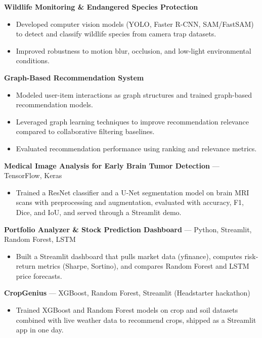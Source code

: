 \documentclass[a4paper,8pt]{extarticle}
\makeatletter
\newcommand{\v}[2]{%
  \edef\@vtmp{,\variant,}%
  \expandafter\in@\expandafter{\@vtmp}{,#1,}%
  \ifin@ #2\fi}
\makeatother
\begin{document}
\v{main,ml,ds,cv,res}{%
\noindent
\textbf{Wildlife Monitoring \& Endangered Species Protection}
\begin{itemize}
\item Developed computer vision models (YOLO, Faster R-CNN, SAM/FastSAM) to detect and classify wildlife species from camera trap datasets.
\item Improved robustness to motion blur, occlusion, and low-light environmental conditions.
\end{itemize}
}

\v{main,ml,ds,res}{%
\noindent
\textbf{Graph-Based Recommendation System}
\begin{itemize}
\item Modeled user-item interactions as graph structures and trained graph-based recommendation models.
\item Leveraged graph learning techniques to improve recommendation relevance compared to collaborative filtering baselines.
\item Evaluated recommendation performance using ranking and relevance metrics.
\end{itemize}
}

\v{cv}{%
\noindent
\textbf{Medical Image Analysis for Early Brain Tumor Detection} --- TensorFlow, Keras
\begin{itemize}
\item Trained a ResNet classifier and a U-Net segmentation model on brain MRI scans with preprocessing and augmentation, evaluated with accuracy, F1, Dice, and IoU, and served through a Streamlit demo.
\end{itemize}
}

\v{ds}{%
\noindent
\textbf{Portfolio Analyzer \& Stock Prediction Dashboard} --- Python, Streamlit, Random Forest, LSTM
\begin{itemize}
\item Built a Streamlit dashboard that pulls market data (yfinance), computes risk-return metrics (Sharpe, Sortino), and compares Random Forest and LSTM price forecasts.
\end{itemize}
\noindent
\textbf{CropGenius} --- XGBoost, Random Forest, Streamlit (Headstarter hackathon)
\begin{itemize}
\item Trained XGBoost and Random Forest models on crop and soil datasets combined with live weather data to recommend crops, shipped as a Streamlit app in one day.
\end{itemize}
}
\end{document}
